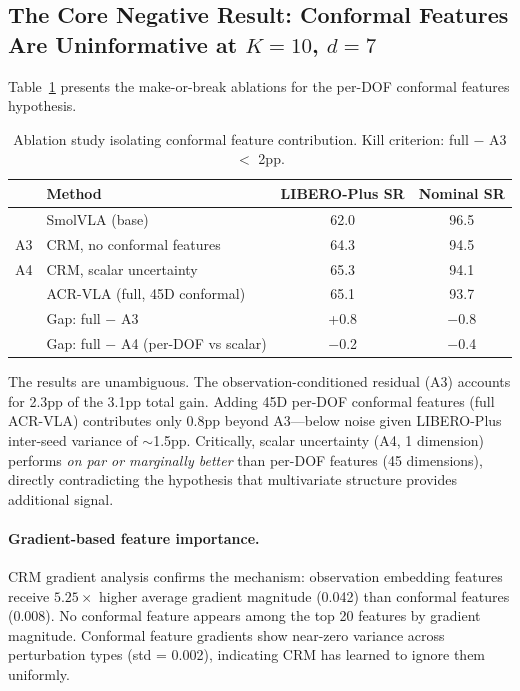 \documentclass[letterpaper]{article}
\newcommand{\fail}[1]{\textcolor{failred}{#1}}
\begin{document}
\subsection{The Core Negative Result: Conformal Features Are Uninformative at $K{=}10$, $d{=}7$}

Table~\ref{tab:ablation_core} presents the make-or-break ablations for the per-DOF conformal features hypothesis.

\begin{table}[h]
\centering
\caption{Ablation study isolating conformal feature contribution. Kill criterion: full $-$ A3 $<$ 2pp.}
\label{tab:ablation_core}
\begin{tabular}{llcc}
\toprule
& \textbf{Method} & \textbf{LIBERO-Plus SR} & \textbf{Nominal SR} \\
\midrule
& SmolVLA (base) & 62.0 & 96.5 \\
A3 & CRM, no conformal features & 64.3 & 94.5 \\
A4 & CRM, scalar uncertainty & 65.3 & 94.1 \\
& ACR-VLA (full, 45D conformal) & 65.1 & 93.7 \\
\midrule
& Gap: full $-$ A3 & \fail{+0.8} & $-$0.8 \\
& Gap: full $-$ A4 (per-DOF vs scalar) & \fail{$-$0.2} & $-$0.4 \\
\bottomrule
\end{tabular}
\end{table}

The results are unambiguous.
The observation-conditioned residual (A3) accounts for 2.3pp of the 3.1pp total gain.
Adding 45D per-DOF conformal features (full ACR-VLA) contributes only 0.8pp beyond A3---below noise given LIBERO-Plus inter-seed variance of $\sim$1.5pp.
Critically, scalar uncertainty (A4, 1 dimension) performs \emph{on par or marginally better} than per-DOF features (45 dimensions), directly contradicting the hypothesis that multivariate structure provides additional signal.

\paragraph{Gradient-based feature importance.}
CRM gradient analysis confirms the mechanism: observation embedding features receive $5.25\times$ higher average gradient magnitude (0.042) than conformal features (0.008).
No conformal feature appears among the top 20 features by gradient magnitude.
Conformal feature gradients show near-zero variance across perturbation types (std = 0.002), indicating CRM has learned to ignore them uniformly.
\end{document}
